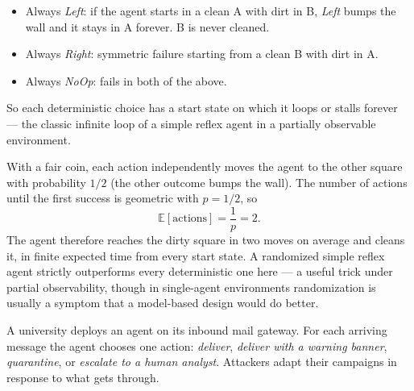 \begin{enumerate}
\begin{sol}
\begin{itemize}[leftmargin=1.5em]
\item Always \textit{Left}: if the agent starts in a clean A with dirt in B, \textit{Left}
bumps the wall and it stays in A forever. B is never cleaned.
\item Always \textit{Right}: symmetric failure starting from a clean B with dirt in A.
\item Always \textit{NoOp}: fails in both of the above.
\end{itemize}
So each deterministic choice has a start state on which it loops or stalls forever --- the
classic infinite loop of a simple reflex agent in a partially observable environment.

With a fair coin, each action independently moves the agent to the other square with
probability $1/2$ (the other outcome bumps the wall). The number of actions until the first
success is geometric with $p = 1/2$, so
\[
\mathbb{E}[\text{actions}] = \frac{1}{p} = 2.
\]
The agent therefore reaches the dirty square in two moves on average and cleans it, in finite
expected time from every start state. A randomized simple reflex agent strictly outperforms
every deterministic one here --- a useful trick under partial observability, though in
single-agent environments randomization is usually a symptom that a model-based design would
do better.
\end{sol}
\end{enumerate}

\newpage

A university deploys an agent on its inbound mail gateway. For each arriving message the agent
chooses one action: \textit{deliver}, \textit{deliver with a warning banner}, \textit{quarantine},
or \textit{escalate to a human analyst}. Attackers adapt their campaigns in response to what
gets through.

